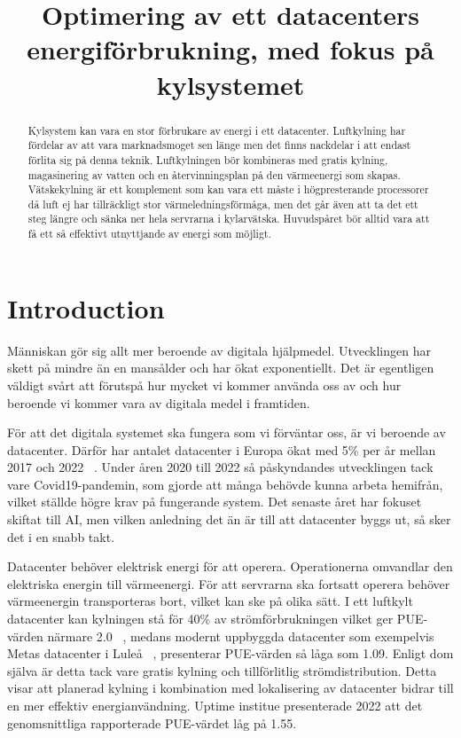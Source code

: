\documentclass[conference,a4paper]{IEEEtran}
\begin{document}
\title{Optimering av ett datacenters energiförbrukning, med fokus på kylsystemet}
\author{
}
\maketitle
\begin{abstract}
Kylsystem kan vara en stor förbrukare av energi i ett datacenter. Luftkylning har fördelar av att vara marknadsmoget sen länge men det finns nackdelar 
i att endast förlita sig på denna teknik. Luftkylningen bör kombineras med gratis kylning, magasinering av vatten och en återvinningsplan på den värmeenergi 
som skapas. Vätskekylning är ett komplement som kan vara ett måste i högpresterande processorer då luft ej har tillräckligt stor värmeledningsförmåga, men 
det går även att ta det ett steg längre och sänka ner hela servrarna i kylarvätska. Huvudspåret bör alltid vara att få ett så effektivt utnyttjande 
av energi som möjligt.  
\end{abstract}
\section{Introduction}
Människan gör sig allt mer beroende av digitala hjälpmedel. Utvecklingen har skett på mindre än en mansålder 
och har ökat exponentiellt. Det är egentligen väldigt svårt att förutspå hur mycket vi kommer använda oss av och hur beroende vi kommer vara av 
digitala medel i framtiden.

För att det digitala systemet ska fungera som vi förväntar oss, är vi beroende av datacenter. Därför har antalet datacenter i Europa ökat med 5\% per år
mellan 2017 och 2022 ~\cite{marketoverview1}. Under åren 2020 till 2022 så påskyndandes utvecklingen tack vare Covid19-pandemin, som gjorde att många 
behövde kunna arbeta hemifrån, vilket ställde högre krav på fungerande system. Det senaste året har fokuset skiftat till AI, men vilken anledning det än 
är till att datacenter byggs ut, så sker det i en snabb takt. 

Datacenter behöver elektrisk energi för att operera. Operationerna omvandlar den elektriska energin till värmeenergi. För att servrarna ska fortsatt operera behöver 
värmeenergin transporteras bort, vilket kan ske på olika sätt. I ett luftkylt datacenter kan kylningen stå för 40\% av strömförbrukningen vilket ger PUE-värden närmare 2.0 
~\cite{modelling2}\cite{energy3}, medans modernt uppbyggda datacenter som exempelvis Metas datacenter i Luleå ~\cite{META}, presenterar PUE-värden så låga som 
1.09. Enligt dom själva är detta tack vare gratis kylning och tillförlitlig strömdistribution. Detta visar att planerad kylning i kombination med 
lokalisering av datacenter bidrar till en mer effektiv energianvändning. \cite{PUE} Uptime institue presenterade 2022 att det genomsnittliga rapporterade PUE-värdet låg på
1.55. 
\end{document}
